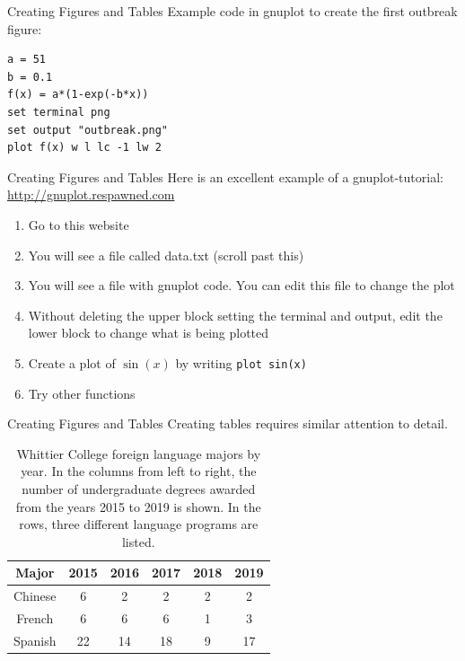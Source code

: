 \documentclass{beamer}
\begin{document}
\begin{frame}[fragile]{Creating Figures and Tables}
\small
Example code in gnuplot to create the first outbreak figure:
\begin{verbatim}
a = 51
b = 0.1
f(x) = a*(1-exp(-b*x))
set terminal png
set output "outbreak.png"
plot f(x) w l lc -1 lw 2
\end{verbatim}
\end{frame}

\begin{frame}[fragile]{Creating Figures and Tables}
Here is an excellent example of a gnuplot-tutorial: \\
\url{http://gnuplot.respawned.com}
\begin{enumerate}
\item Go to this website
\item You will see a file called data.txt (scroll past this)
\item You will see a file with gnuplot code.  You can edit this file to change the plot
\item Without deleting the upper block setting the terminal and output, edit the lower block to change what is being plotted
\item Create a plot of $\sin(x)$ by writing \verb+plot sin(x)+
\item Try other functions
\end{enumerate}
\end{frame}

\begin{frame}[fragile]{Creating Figures and Tables}
Creating tables requires similar attention to detail.
\begin{table}
\centering
\begin{tabular}{| c | c | c | c | c | c |}
\hline
\hline
Major & 2015 & 2016 & 2017 & 2018 & 2019 \\ \hline
Chinese & 6 & 2 & 2 & 2 & 2 \\ \hline
French & 6 & 6 & 6 & 1 & 3 \\ \hline
Spanish & 22 & 14 & 18 & 9 & 17 \\ \hline
\hline
\end{tabular}
\caption{\label{tab:lang} Whittier College foreign language majors by year.  In the columns from left to right, the number of undergraduate degrees awarded from the years 2015 to 2019 is shown.  In the rows, three different language programs are listed.}
\end{table}
\end{frame}
\end{document}
